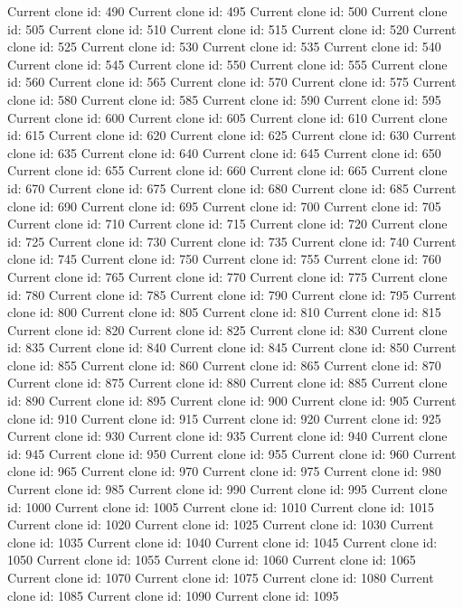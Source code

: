 \documentclass[letterpaper,10pt,english]{sphinxmanual}
\begin{document}
{\begin{sphinxVerbatim}[commandchars=\\\{\}]
Current clone id: 490
Current clone id: 495
Current clone id: 500
Current clone id: 505
Current clone id: 510
Current clone id: 515
Current clone id: 520
Current clone id: 525
Current clone id: 530
Current clone id: 535
Current clone id: 540
Current clone id: 545
Current clone id: 550
Current clone id: 555
Current clone id: 560
Current clone id: 565
Current clone id: 570
Current clone id: 575
Current clone id: 580
Current clone id: 585
Current clone id: 590
Current clone id: 595
Current clone id: 600
Current clone id: 605
Current clone id: 610
Current clone id: 615
Current clone id: 620
Current clone id: 625
Current clone id: 630
Current clone id: 635
Current clone id: 640
Current clone id: 645
Current clone id: 650
Current clone id: 655
Current clone id: 660
Current clone id: 665
Current clone id: 670
Current clone id: 675
Current clone id: 680
Current clone id: 685
Current clone id: 690
Current clone id: 695
Current clone id: 700
Current clone id: 705
Current clone id: 710
Current clone id: 715
Current clone id: 720
Current clone id: 725
Current clone id: 730
Current clone id: 735
Current clone id: 740
Current clone id: 745
Current clone id: 750
Current clone id: 755
Current clone id: 760
Current clone id: 765
Current clone id: 770
Current clone id: 775
Current clone id: 780
Current clone id: 785
Current clone id: 790
Current clone id: 795
Current clone id: 800
Current clone id: 805
Current clone id: 810
Current clone id: 815
Current clone id: 820
Current clone id: 825
Current clone id: 830
Current clone id: 835
Current clone id: 840
Current clone id: 845
Current clone id: 850
Current clone id: 855
Current clone id: 860
Current clone id: 865
Current clone id: 870
Current clone id: 875
Current clone id: 880
Current clone id: 885
Current clone id: 890
Current clone id: 895
Current clone id: 900
Current clone id: 905
Current clone id: 910
Current clone id: 915
Current clone id: 920
Current clone id: 925
Current clone id: 930
Current clone id: 935
Current clone id: 940
Current clone id: 945
Current clone id: 950
Current clone id: 955
Current clone id: 960
Current clone id: 965
Current clone id: 970
Current clone id: 975
Current clone id: 980
Current clone id: 985
Current clone id: 990
Current clone id: 995
Current clone id: 1000
Current clone id: 1005
Current clone id: 1010
Current clone id: 1015
Current clone id: 1020
Current clone id: 1025
Current clone id: 1030
Current clone id: 1035
Current clone id: 1040
Current clone id: 1045
Current clone id: 1050
Current clone id: 1055
Current clone id: 1060
Current clone id: 1065
Current clone id: 1070
Current clone id: 1075
Current clone id: 1080
Current clone id: 1085
Current clone id: 1090
Current clone id: 1095
\end{sphinxVerbatim}
}
\end{document}
